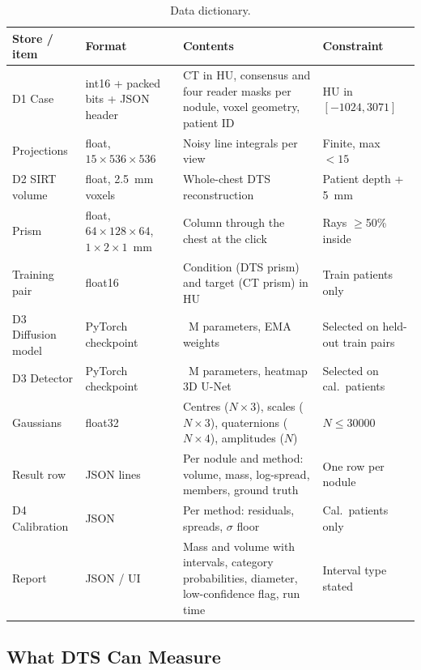 \begin{table}[!htbp]
\centering\small
\caption{Data dictionary.}
\label{tab:dict}
\begin{tabularx}{\linewidth}{>{\raggedright\arraybackslash}p{3.1cm} >{\raggedright\arraybackslash}p{3.0cm} >{\raggedright\arraybackslash}X >{\raggedright\arraybackslash}p{2.8cm}}
\toprule
Store / item & Format & Contents & Constraint \\
\midrule
D1 Case & int16 + packed bits + JSON header & CT in HU, consensus and four reader masks per nodule, voxel geometry, patient ID & HU in $[-1024, 3071]$ \\
Projections & float, $15{\times}536{\times}536$ & Noisy line integrals per view & Finite, max $<15$ \\
D2 SIRT volume & float, 2.5~mm voxels & Whole-chest DTS reconstruction & Patient depth + 5~mm \\
Prism & float, $64{\times}128{\times}64$, $1{\times}2{\times}1$~mm & Column through the chest at the click & Rays $\geq$50\% inside \\
Training pair & float16 & Condition (DTS prism) and target (CT prism) in HU & Train patients only \\
D3 Diffusion model & PyTorch checkpoint & 17.42~M parameters, EMA weights & Selected on held-out train pairs \\
D3 Detector & PyTorch checkpoint & 0.34~M parameters, heatmap 3D U-Net & Selected on cal.\ patients \\
Gaussians & float32 & Centres ($N{\times}3$), scales ($N{\times}3$), quaternions ($N{\times}4$), amplitudes ($N$) & $N \leq \num{30000}$ \\
Result row & JSON lines & Per nodule and method: volume, mass, log-spread, members, ground truth & One row per nodule \\
D4 Calibration & JSON & Per method: residuals, spreads, $\sigma$ floor & Cal.\ patients only \\
Report & JSON / UI & Mass and volume with intervals, category probabilities, diameter, low-confidence flag, run time & Interval type stated \\
\bottomrule
\end{tabularx}
\end{table}

\subsection{What DTS Can Measure}

